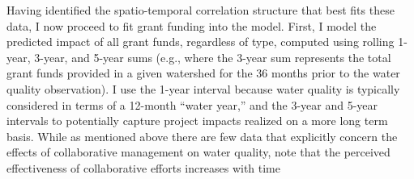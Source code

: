 \documentclass[12pt,a4paper,titlepage]{article}
\begin{document}
Having identified the spatio-temporal correlation structure that best fits these data, I now proceed to fit grant funding into the model. First, I model the predicted impact of all grant funds, regardless of type, computed using rolling 1-year, 3-year, and 5-year sums (e.g., where the 3-year sum represents the total grant funds provided in a given watershed for the 36 months prior to the water quality observation). I use the 1-year interval because water quality is typically considered in terms of a 12-month ``water year,'' and the 3-year and 5-year intervals to potentially capture project impacts realized on a more long term basis. While as mentioned above there are few data that explicitly concern the effects of collaborative management on water quality, \textcite[][p. 281]{lubell2009} note that the perceived effectiveness of collaborative efforts increases with time \parencite[see also][]{leach2002, leach2006}
\end{document}
